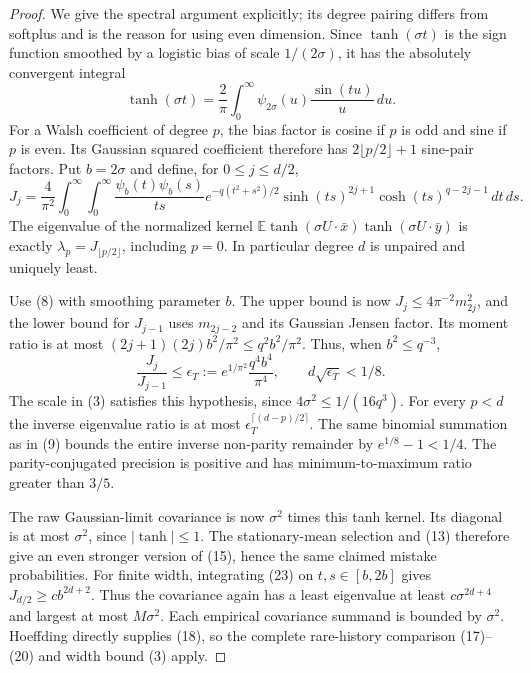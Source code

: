 \documentclass[11pt]{article}
\newcommand{\E}{\mathbb E}\newcommand{\Pp}{\mathbb P}
\begin{document}
\begin{proof}
We give the spectral argument explicitly; its degree pairing differs
from softplus and is the reason for using even dimension.
Since $\tanh(\sigma t)$ is the sign function smoothed by a logistic
bias of scale $1/(2\sigma)$, it has the absolutely convergent integral
\[
 \tanh(\sigma t)=\frac2\pi\int_0^\infty
                           \psi_{2\sigma}(u)\frac{\sin(tu)}u\,du.
\]
For a Walsh coefficient of degree $p$, the bias factor is cosine if
$p$ is odd and sine if $p$ is even. Its Gaussian squared coefficient
therefore has $2\lfloor p/2\rfloor+1$ sine-pair factors. Put
$b=2\sigma$ and define, for $0\le j\le d/2$,
\[
 J_j=\frac4{\pi^2}\int_0^\infty\!\int_0^\infty
 \frac{\psi_b(t)\psi_b(s)}{ts}
 e^{-q(t^2+s^2)/2}\sinh(ts)^{2j+1}
                         \cosh(ts)^{q-2j-1}\,dt\,ds.          \tag{23}
\]
The eigenvalue of the normalized kernel
$\E\tanh(\sigma U\cdot\bar x)\tanh(\sigma U\cdot\bar y)$
is exactly $\lambda_p=J_{\lfloor p/2\rfloor}$, including $p=0$.
In particular degree $d$ is unpaired and uniquely least.

Use (8) with smoothing parameter $b$. The upper bound is now
$J_j\le4\pi^{-2}m_{2j}^2$, and the lower bound for $J_{j-1}$ uses
$m_{2j-2}$ and its Gaussian Jensen factor. Its moment ratio is at most
$(2j+1)(2j)b^2/\pi^2\le q^2b^2/\pi^2$.
Thus, when $b^2\le q^{-3}$,
\[
 \frac{J_j}{J_{j-1}}\le\epsilon_T
       :=e^{1/\pi^2}\frac{q^4b^4}{\pi^4},\qquad
 d\sqrt{\epsilon_T}<1/8.                                \tag{24}
\]
The scale in (3) satisfies this hypothesis, since
$4\sigma^2\le1/(16q^3)$.
For every $p<d$ the inverse eigenvalue ratio is at most
$\epsilon_T^{\lceil(d-p)/2\rceil}$.
The same binomial summation as in (9) bounds the entire inverse
non-parity remainder by $e^{1/8}-1<1/4$.
The parity-conjugated precision is positive and has minimum-to-maximum
ratio greater than $3/5$.

The raw Gaussian-limit covariance is now $\sigma^2$ times this tanh
kernel. Its diagonal is at most $\sigma^2$, since $|\tanh|\le1$.
The stationary-mean selection and (13) therefore give an even stronger
version of (15), hence the same claimed mistake probabilities.
For finite width, integrating (23) on $t,s\in[b,2b]$ gives
$J_{d/2}\ge c b^{2d+2}$. Thus the covariance again has a least
eigenvalue at least $c\sigma^{2d+4}$ and largest at most $M\sigma^2$.
Each empirical covariance summand is bounded by $\sigma^2$.
Hoeffding directly supplies (18), so the complete rare-history
comparison (17)--(20) and width bound (3) apply.


\end{proof}
\end{document}

